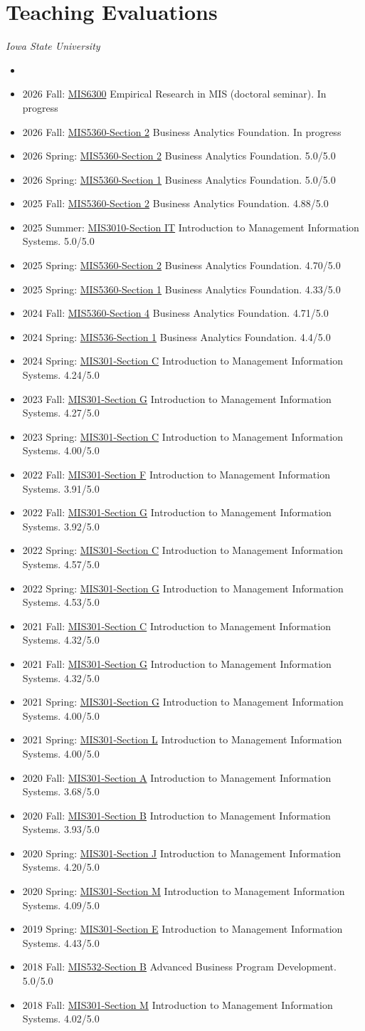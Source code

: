\documentclass[paper=letter,fontsize=10pt]{scrartcl} %
\newcommand{\NewPart}[2]{\section*{{#1} #2}}
\newcommand{\CourseEntry}[4]{
		\noindent \item{#1: \ul{#2} #3 #4}}
\begin{document}
\NewPart{Teaching Evaluations}{}
\noindent\textit{Iowa State University}
\begin{itemize}
\item[]
\vspace{-18pt}
\CourseEntry{2026 Fall}{MIS6300}{Empirical Research in MIS (doctoral seminar).}{In progress}
\CourseEntry{2026 Fall}{MIS5360-Section 2}{Business Analytics Foundation.}{In progress}
\CourseEntry{2026 Spring}{MIS5360-Section 2}{Business Analytics Foundation.}{5.0/5.0}
\CourseEntry{2026 Spring}{MIS5360-Section 1}{Business Analytics Foundation.}{5.0/5.0}
\CourseEntry{2025 Fall}{MIS5360-Section 2}{Business Analytics Foundation.}{4.88/5.0}
\CourseEntry{2025 Summer}{MIS3010-Section IT}{Introduction to Management Information Systems.}{5.0/5.0}
\CourseEntry{2025 Spring}{MIS5360-Section 2}{Business Analytics Foundation.}{4.70/5.0}
\CourseEntry{2025 Spring}{MIS5360-Section 1}{Business Analytics Foundation.}{4.33/5.0}
\CourseEntry{2024 Fall}{MIS5360-Section 4}{Business Analytics Foundation.}{4.71/5.0}
\CourseEntry{2024 Spring}{MIS536-Section 1}{Business Analytics Foundation.}{4.4/5.0}
\CourseEntry{2024 Spring}{MIS301-Section C}{Introduction to Management Information Systems.}{4.24/5.0}
\CourseEntry{2023 Fall}{MIS301-Section G}{Introduction to Management Information Systems.}{4.27/5.0}
\CourseEntry{2023 Spring}{MIS301-Section C}{Introduction to Management Information Systems.}{4.00/5.0}
\CourseEntry{2022 Fall}{MIS301-Section F}{Introduction to Management Information Systems.}{3.91/5.0}
\CourseEntry{2022 Fall}{MIS301-Section G}{Introduction to Management Information Systems.}{3.92/5.0}
\CourseEntry{2022 Spring}{MIS301-Section C}{Introduction to Management Information Systems.}{4.57/5.0}
\CourseEntry{2022 Spring}{MIS301-Section G}{Introduction to Management Information Systems.}{4.53/5.0}
\CourseEntry{2021 Fall}{MIS301-Section C}{Introduction to Management Information Systems.}{4.32/5.0}
\CourseEntry{2021 Fall}{MIS301-Section G}{Introduction to Management Information Systems.}{4.32/5.0}
\CourseEntry{2021 Spring}{MIS301-Section G}{Introduction to Management Information Systems.}{4.00/5.0}
\CourseEntry{2021 Spring}{MIS301-Section L}{Introduction to Management Information Systems.}{4.00/5.0}
\CourseEntry{2020 Fall}{MIS301-Section A}{Introduction to Management Information Systems.}{3.68/5.0}
\CourseEntry{2020 Fall}{MIS301-Section B}{Introduction to Management Information Systems.}{3.93/5.0}
\CourseEntry{2020 Spring}{MIS301-Section J}{Introduction to Management Information Systems.}{4.20/5.0}
\CourseEntry{2020 Spring}{MIS301-Section M}{Introduction to Management Information Systems.}{4.09/5.0}
\CourseEntry{2019 Spring}{MIS301-Section E}{Introduction to Management Information Systems.}{4.43/5.0}
\CourseEntry{2018 Fall}{MIS532-Section B}{Advanced Business Program Development.}{5.0/5.0}
\CourseEntry{2018 Fall}{MIS301-Section M}{Introduction to Management Information Systems.}{4.02/5.0}


\end{itemize}
\end{document}
